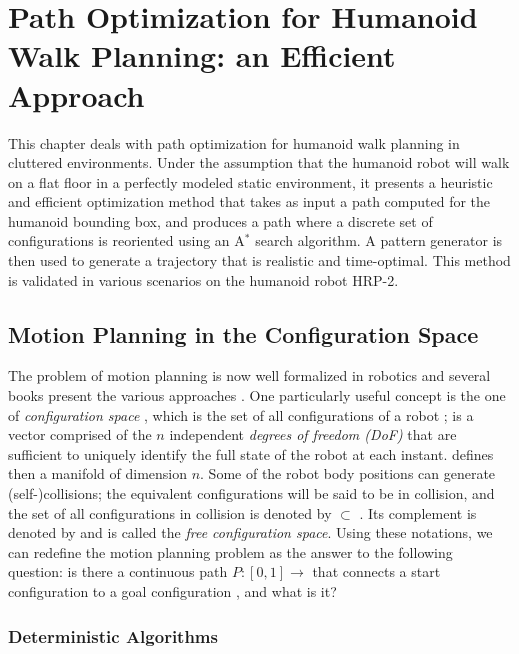 \chapter{Path Optimization for Humanoid Walk Planning: an Efficient Approach}
\label{chap:path-optim}

This chapter deals with path optimization for humanoid walk planning
in cluttered environments. Under the assumption that the humanoid
robot will walk on a flat floor in a perfectly modeled static
environment, it presents a heuristic and efficient optimization method
that takes as input a path computed for the humanoid bounding box, and
produces a path where a discrete set of configurations is reoriented
using an A$^{*}$ search algorithm. A pattern generator is then used to
generate a trajectory that is realistic and time-optimal. This method
is validated in various scenarios on the humanoid robot HRP-2.

\section{Motion Planning in the Configuration Space}
\label{sec:chap1-motion-planning}

The problem of motion planning is now well formalized in robotics and
several books present the various approaches
\cite{lato91,chos05,lava06}. One particularly useful concept is the
one of \emph{configuration space} {\cspace} \cite{loza83}, which is
the set of all configurations \config{} of a robot {\robot}; \config{}
is a vector comprised of the $n$ independent \emph{degrees of freedom
  (DoF)} that are sufficient to uniquely identify the full state of
the robot at each instant. {\cspace} defines then a manifold of
dimension $n$. Some of the robot body positions can generate
(self-)collisions; the equivalent configurations will be said to be in
collision, and the set of all configurations in collision is denoted
by {\cobs} $\subset$ {\cspace}. Its complement is denoted by {\cfree}
and is called the \emph{free configuration space}. Using these
notations, we can redefine the motion planning problem as the answer
to the following question: is there a continuous path $P: [0,1]
\rightarrow$ {\cfree} that connects a start configuration 
to a goal configuration , and what is it?

\subsection{Deterministic Algorithms}
\label{subsec:chap1-deterministic algorithms}

